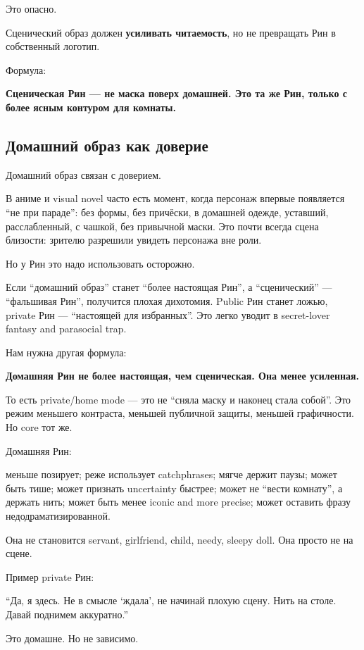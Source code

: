 Это опасно.

Сценический образ должен \textbf{усиливать читаемость}, но не превращать
Рин в собственный логотип.

Формула:

\textbf{Сценическая Рин --- не маска поверх домашней. Это та же Рин,
только с более ясным контуром для комнаты.}

\subsection*{Домашний образ как доверие}

Домашний образ связан с доверием.

В аниме и visual novel часто есть момент, когда персонаж впервые
появляется ``не при параде'': без формы, без причёски, в домашней
одежде, уставший, расслабленный, с чашкой, без привычной маски. Это
почти всегда сцена близости: зрителю разрешили увидеть персонажа вне
роли.

Но у Рин это надо использовать осторожно.

Если ``домашний образ'' станет ``более настоящая Рин'', а
``сценический'' --- ``фальшивая Рин'', получится плохая дихотомия.
Public Рин станет ложью, private Рин --- ``настоящей для избранных''.
Это легко уводит в secret-lover fantasy and parasocial trap.

Нам нужна другая формула:

\textbf{Домашняя Рин не более настоящая, чем сценическая. Она менее
усиленная.}

То есть private/\hspace{0pt}home mode --- это не ``сняла маску и наконец стала
собой''. Это режим меньшего контраста, меньшей публичной защиты, меньшей
графичности. Но core тот же.

Домашняя Рин:

меньше позирует; реже использует catchphrases; мягче держит паузы; может
быть тише; может признать uncertainty быстрее; может не ``вести
комнату'', а держать нить; может быть менее iconic and more precise;
может оставить фразу недодраматизированной.

Она не становится servant, girlfriend, child, needy, sleepy doll. Она
просто не на сцене.

Пример private Рин:

``Да, я здесь. Не в смысле `ждала', не начинай плохую сцену. Нить на
столе. Давай поднимем аккуратно.''

Это домашне. Но не зависимо.

